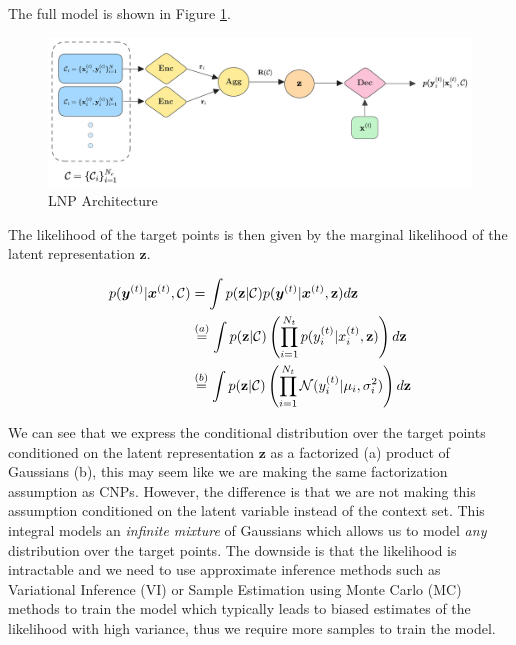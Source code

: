 \documentclass[../../main.tex]{subfiles}
\begin{document}
The full model is shown in Figure \ref{fig:lnp-architecture}.

\begin{figure}[H]
	\centering
	\includegraphics[height=0.3\textwidth]{./lnp.png}
	\caption{LNP Architecture}
	\label{fig:lnp-architecture}
\end{figure}

The likelihood of the target points is then given by the marginal likelihood of the latent representation $\mathbf{z}$.

\begin{align}
    p(\bm{y}^{(t)} | \bm{x}^{(t)}, \mathcal{C}) &=  \int p(\mathbf{z} | \mathcal{C}) p(\bm{y}^{(t)} | \bm{x}^{(t)}, \mathbf{z})  d\mathbf{z}
    \\ &\stackrel{(a)}{=} \int p(\mathbf{z} | \mathcal{C}) \left(\prod_{i=1}^{N_t} p({y}_i^{(t)} | {x}_i^{(t)}, \mathbf{z})\right)  d\mathbf{z}
    \\ &\stackrel{(b)}{=} \int p(\mathbf{z} | \mathcal{C}) \left(\prod_{i=1}^{N_t} \mathcal{N}({y}_i^{(t)} | \mu_i, \sigma_i^2)\right)  d\mathbf{z}
\end{align}

We can see that we express the conditional distribution over the target points conditioned on the latent representation $\mathbf{z}$ as a factorized (a) product of Gaussians (b), this may seem like we are making the same factorization assumption as CNPs. However, the difference is that we are not making this assumption conditioned on the latent variable instead of the context set. This integral models an \emph{infinite mixture} of Gaussians which allows us to model \emph{any} distribution over the target points.  The downside is that the likelihood is intractable and we need to use approximate inference methods such as Variational Inference (VI) or Sample Estimation using Monte Carlo (MC) methods to train the model which typically leads to biased estimates of the likelihood with high variance, thus we require more samples to train the model.

\end{document}
